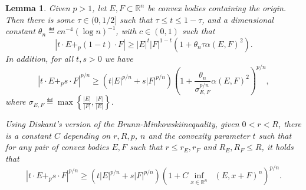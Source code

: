 \documentclass[a4paper, 10pt, twoside]{amsart}
\numberwithin{equation}{section}
\newcommand{\lemmname}{Lemma}
\theoremstyle{plain}
\newtheorem{lemma}[theorem]{\lemmname}
\theoremstyle{definition}
\DeclareMathOperator{\dH}{\mathrm{d}_\mathrm{H}}
\begin{document}
\begin{lemma}\label{lemma.quantitative_LpBM}
    Given $p > 1$, let $E,F \subset \mathbb{R}^n$ be convex bodies containing the origin. Then there is some $\tau \in (0,1/2]$ such that $\tau \le t \le 1 - \tau$, and a dimensional constant $\theta_n \eqdef cn^{-4}{(\log n)}^{-1}$, with $c \in (0,1)$ such that
    \begin{equation}
        |t\cdot E +_p (1-t) \cdot F| \ge 
        |E|^t|F|^{1-t} 
        \left(
            1 + \theta_n \tau {\alpha(E,F)}^2
        \right).
    \end{equation}
    In addition, for all $t,s > 0$ we have 
    \begin{equation}
        {|t\cdot E +_p s\cdot F|}^{p/n} 
        \ge 
        \left(
            t {|E|}^{p/n} + s {|F|}^{p/n}
        \right)
        {\left(
            1 + \frac{\theta_n}{
                \sigma^{p/n}_{E,F}
            } {\alpha(E,F)}^2
        \right)}^{p/n},
    \end{equation}
    where $\sigma_{E,F} \eqdef \max \left\{
        \frac{|E|}{|F|},\frac{|F|}{|E|}
    \right\}$. 

    Using Diskant's version of the Brunn-Minkowskiinequality, given $0 <r <R$, there is a constant $C$ depending on $r,R,p$, $n$ and the convexity parameter $t$ such that for any pair of convex bodies $E,F$ such that $r\le r_E, r_F$ and $R_E,R_F \le R$, it holds that 
    \begin{equation}\label{eq.hausdorff_Lp_BM}
        {|t\cdot E +_p s\cdot F|}^{p/n} 
        \ge 
        \left(
            t {|E|}^{p/n} + s {|F|}^{p/n}
        \right)
        {\left(
            1 + C \inf_{x \in \mathbb{R}^n} 
        \dH(E, x + F)^n
        \right)}^{p/n}.
    \end{equation}
\end{lemma}
\end{document}
